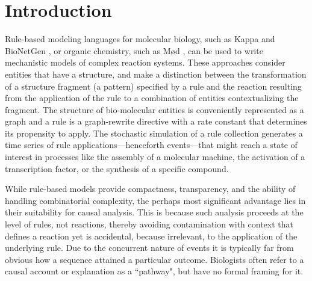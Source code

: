 
\section{Introduction}\label{sec:intro}

Rule-based modeling languages for molecular biology, such as Kappa
\cite{DanosEtAl-CONCUR07} and BioNetGen \cite{bngl}, or organic
chemistry, such as M{\o}d \cite{moll}, can be used to write
mechanistic models of complex reaction systems. These approaches
consider entities that have a structure, and make a distinction
between the transformation of a structure fragment (a pattern)
specified by a rule and the reaction resulting from the application
of the rule to a combination of entities contextualizing the
fragment. The structure of bio-molecular entities is conveniently
represented as a graph and a rule is a graph-rewrite directive with a
rate constant that determines its propensity to apply. The stochastic
simulation of a rule collection generates a time series of rule
applications---henceforth events---that might reach a state of
interest in processes like the assembly of a molecular machine, the
activation of a transcription factor, or the synthesis of a specific
compound.

While rule-based models provide compactness, transparency, and the ability of
handling combinatorial complexity, the perhaps most significant advantage lies
in their suitability for causal analysis. This is because such analysis proceeds
at the level of rules, not reactions, thereby avoiding contamination with
context that defines a reaction yet is accidental, because irrelevant, to the
application of the underlying rule. Due to the concurrent nature of events it is
typically far from obvious how a sequence attained a particular
outcome. Biologists often refer to a causal account or explanation as a
``pathway", but have no formal framing for it.

